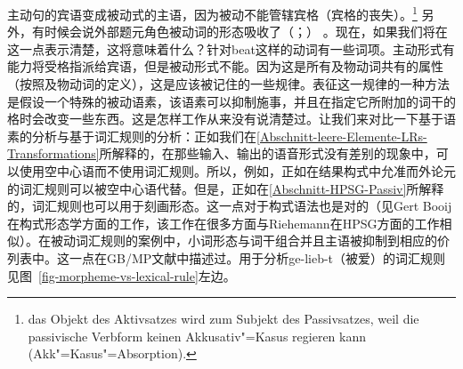 \ex 主动句的宾语变成被动式的主语，因为被动不能管辖宾格（宾格的丧失）。\footnote{
das Objekt des Aktivsatzes wird zum Subjekt des Passivsatzes, weil die passivische Verbform
keinen Akkusativ"=Kasus regieren kann (Akk"=Kasus"=Absorption).}\citep[]{Lohnstein2014a} 
\zl
另外，有时候会说外部题元角色被动词的形态吸收了（\citealp{Jaeggli86a}；\citealp[]{Haegeman94a-u}） 。现在，如果我们将在这一点表示清楚，这将意味着什么？针对beat这样的动词有一些词项。主动形式有能力将受格指派给宾语，但是被动形式不能。因为这是所有及物动词共有的属性（按照及物动词的定义），这是应该被记住的一些规律。表征这一规律的一种方法是假设一个特殊的被动语素，该语素可以抑制施事，并且在指定它所附加的词干的格时会改变一些东西。这是怎样工作从来没有说清楚过。让我们来对比一下基于语素的分析与基于词汇规则的分析：正如我们在\ref{Abschnitt-leere-Elemente-LRs-Transformations}所解释的，在那些输入、输出的语音形式没有差别的现象中，可以使用空中心语而不使用词汇规则。所以，例如，正如在结果构式中允准而外论元的词汇规则可以被空中心语代替。但是，正如在\ref{Abschnitt-HPSG-Passiv}所解释的，词汇规则也可以用于刻画形态。这一点对于构式语法\indexcxgc 也是对的（见Gert Booij在构式形态学方面的工作\citeyearpar{Booij2010a}，该工作在很多方面与Riehemann在HPSG方面的工作相似\citeyearpar{Riehemann93a,Riehemann98a}）。在被动词汇规则的案例中，小词形态与词干组合并且主语被抑制到相应的价列表中。这一点在GB/MP文献中描述过。用于分析ge-lieb-t（被爱）的词汇规则见图~\vref{fig-morpheme-vs-lexical-rule}左边。
